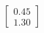 \documentclass[preview]{standalone}
\begin{document}
\begin{align*}
\begin{bmatrix} 0.45 \\ 1.30 \end{bmatrix}
\end{align*}
\end{document}

